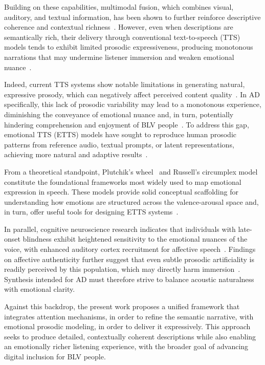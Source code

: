 \documentclass[pdflatex,iicol,sn-mathphys-num]{sn-jnl}%
\theoremstyle{thmstyleone}%
\theoremstyle{thmstyletwo}%
\theoremstyle{thmstylethree}%
\begin{document}
Building on these capabilities, multimodal fusion, which combines visual, auditory, and textual information, has been shown to further reinforce descriptive coherence and contextual richness~\cite{Zhao2020}. However, even when descriptions are semantically rich, their delivery through conventional text-to-speech (TTS) models tends to exhibit limited prosodic expressiveness, producing monotonous narrations that may undermine listener immersion and weaken emotional nuance~\cite{Taha2024,Qi2024}.

Indeed, current TTS systems show notable limitations in generating natural, expressive prosody, which can negatively affect perceived content quality~\cite{Oh2024,Cornille2022}. In AD specifically, this lack of prosodic variability may lead to a monotonous experience, diminishing the conveyance of emotional nuance and, in turn, potentially hindering comprehension and enjoyment of BLV people~\cite{Liu2023,Ben-David2024}. To address this gap, emotional TTS (ETTS) models have sought to reproduce human prosodic patterns from reference audio, textual prompts, or latent representations, achieving more natural and adaptive results~\cite{Bott2024,Cho2024}.

From a theoretical standpoint, Plutchik's wheel~\cite{Plutchik2001,Plutchik1989} and Russell's circumplex model~\cite{Russell1980} constitute the foundational frameworks most widely used to map emotional expression in speech. These models provide solid conceptual scaffolding for understanding how emotions are structured across the valence-arousal space and, in turn, offer useful tools for designing ETTS systems~\cite{Zheng2025,Zhou2023}.

In parallel, cognitive neuroscience research indicates that individuals with late-onset blindness exhibit heightened sensitivity to the emotional nuances of the voice, with enhanced auditory cortex recruitment for affective speech~\cite{Ben-David2024,Liu2024a}. Findings on affective authenticity further suggest that even subtle prosodic artificiality is readily perceived by this population, which may directly harm immersion~\cite{Sarzedas2024,Nussbaum2023}. Synthesis intended for AD must therefore strive to balance acoustic naturalness with emotional clarity.

Against this backdrop, the present work proposes a unified framework that integrates attention mechanisms, in order to refine the semantic narrative, with emotional prosodic modeling, in order to deliver it expressively. This approach seeks to produce detailed, contextually coherent descriptions while also enabling an emotionally richer listening experience, with the broader goal of advancing digital inclusion for BLV people.
\end{document}

